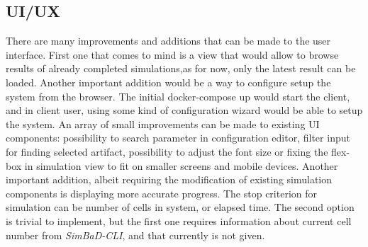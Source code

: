 \subsection{UI/UX}
There are many improvements and additions that can be made to the user interface. First one that comes to mind is a view that would allow to browse results of already completed simulations,as for now, only the latest result can be loaded. Another important addition would be a way to configure setup the system from the browser. The initial docker-compose up would start the client, and in client user, using some kind of configuration wizard would be able to setup the system. An array of small improvements can be made to existing UI components: possibility to search parameter in configuration editor, filter input for finding selected artifact, possibility to adjust the font size or fixing the flex-box in simulation view to fit on smaller screens and mobile devices. Another important addition, albeit requiring the modification of existing simulation components is displaying more accurate progress. The stop criterion for simulation can be number of cells in system, or elapsed time. The second option is trivial to implement, but the first one requires information about current cell number from \textit{SimBaD-CLI}, and that currently is not given.
